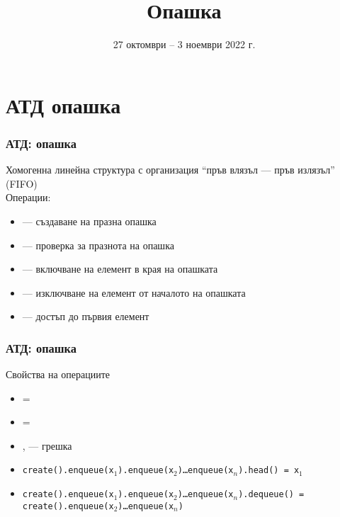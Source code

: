 \documentclass[alsotrans]{beamerswitch}
\title{Опашка}
\date[27.10--3.11.2022 г.]{27 октомври -- 3 ноември 2022 г.}
\begin{document}
\begin{frame}
  \titlepage
\end{frame}

\section{АТД опашка}

\begin{frame}
  \frametitle{АТД: опашка}

  Хомогенна линейна структура с организация ``пръв влязъл --- пръв излязъл'' (FIFO)\\[2ex]
  Операции:\\[1ex]
  \begin{itemize}
  \item {} --- създаване на празна опашка
  \item {} --- проверка за празнота на опашка
  \item {} --- включване на елемент в края на опашката
  \item {} --- изключване на елемент от началото на опашката
  \item {} --- достъп до първия елемент
  \end{itemize}
\end{frame}

\begin{frame}
  \frametitle{АТД: опашка}

  Свойства на операциите\\[1ex]
  \small
  \begin{itemize}
  \item {} = 
  \item {} = 
  \item {},  --- \alert{грешка}
  \item \tt{create().enqueue(x$_1$).enqueue(x$_2$)\ldots{}enqueue(x$_n$).head() = x$_1$}
  \item \tt{create().enqueue(x$_1$).enqueue(x$_2$)\ldots{}enqueue(x$_n$).dequeue() = create().enqueue(x$_2$)\ldots{}enqueue(x$_n$)}
  \end{itemize}
\end{frame}
\end{document}
